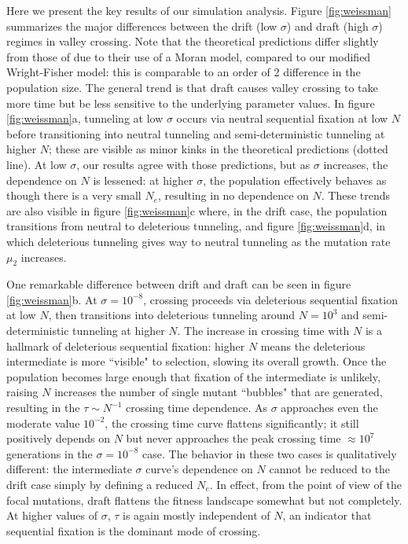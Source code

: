 \documentclass[10pt,twocolumn,twoside]{gsajnl}
\begin{document}
\begin{spacing}{1.5}
Here we present the key results of our simulation analysis.
Figure \ref{fig:weissman} summarizes the major differences between the drift (low $\sigma$) and draft (high $\sigma$) regimes in valley crossing.
Note that the theoretical predictions differ slightly from those of \citet{weissman_2009} due to their use of a Moran model, compared to our modified Wright-Fisher model: this is comparable to an order of 2 difference in the population size.
The general trend is that draft causes valley crossing to take more time but be less sensitive to the underlying parameter values.
In figure \ref{fig:weissman}a, tunneling at low $\sigma$ occurs via neutral sequential fixation at low $N$ before transitioning into neutral tunneling and semi-deterministic tunneling at higher $N$; these are visible as minor kinks in the theoretical predictions (dotted line).
At low $\sigma$, our results agree with those predictions, but as $\sigma$ increases, the dependence on $N$ is lessened: at higher $\sigma$, the population effectively behaves as though there is a very small $N_e$, resulting in no dependence on $N$.
These trends are also visible in figure \ref{fig:weissman}c where, in the drift case, the population transitions from neutral to deleterious tunneling, and figure \ref{fig:weissman}d, in which deleterious tunneling gives way to neutral tunneling as the mutation rate $\mu_2$ increases.

One remarkable difference between drift and draft can be seen in figure \ref{fig:weissman}b.
At $\sigma = 10^{-8}$, crossing proceeds via deleterious sequential fixation at low $N$, then transitions into deleterious tunneling around $N = 10^3$ and semi-deterministic tunneling at higher $N$.
The increase in crossing time with $N$ is a hallmark of deleterious sequential fixation: higher $N$ means the deleterious intermediate is more ``visible" to selection, slowing its overall growth.
Once the population becomes large enough that fixation of the intermediate is unlikely, raising $N$ increases the number of single mutant ``bubbles" that are generated, resulting in the $\tau \sim N^{-1}$ crossing time dependence.
As $\sigma$ approaches even the moderate value $10^{-2}$, the crossing time curve flattens significantly; it still positively depends on $N$ but never approaches the peak crossing time $\approx 10^7$ generations in the $\sigma = 10^{-8}$ case.
The behavior in these two cases is qualitatively different: the intermediate $\sigma$ curve's dependence on $N$ cannot be reduced to the drift case simply by defining a reduced $N_e$.
In effect, from the point of view of the focal mutations, draft flattens the fitness landscape somewhat but not completely.
At higher values of $\sigma$, $\tau$ is again mostly independent of $N$, an indicator that sequential fixation is the dominant mode of crossing.


\end{spacing}
\end{document}
